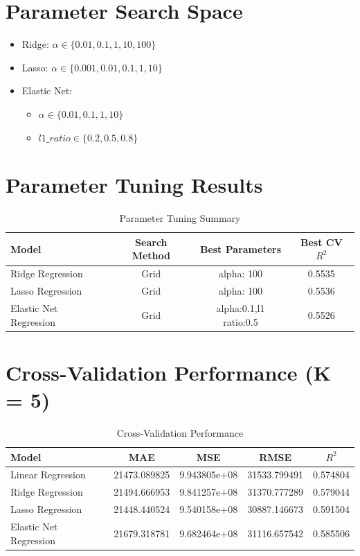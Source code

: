 \documentclass[11pt]{article}
\begin{document}
\section*{Parameter Search Space}
\begin{itemize}
    \item Ridge: $\alpha \in \{0.01, 0.1, 1, 10, 100\}$
    \item Lasso: $\alpha \in \{0.001, 0.01, 0.1, 1, 10\}$
    \item Elastic Net:
    \begin{itemize}
        \item $\alpha \in \{0.01, 0.1, 1, 10\}$
        \item $l1\_ratio \in \{0.2, 0.5, 0.8\}$
    \end{itemize}
\end{itemize}

\section*{Parameter Tuning Results}
\begin{table}[h!]
\centering
\renewcommand{\arraystretch}{1.3}
\caption{Parameter Tuning Summary}
\begin{tabular}{|l|c|c|c|}
\hline
Model & Search Method & Best Parameters & Best CV $R^2$ \\ \hline
Ridge Regression & Grid &alpha: 100  &0.5535 \\
Lasso Regression & Grid &alpha: 100  &0.5536  \\
Elastic Net Regression & Grid &alpha:0.1,l1 ratio:0.5  &  0.5526 \\ \hline
\end{tabular}
\end{table}

\section*{Cross-Validation Performance (K = 5)}
\begin{table}[h!]
\centering
\renewcommand{\arraystretch}{1.3}
\caption{Cross-Validation Performance}
\begin{tabular}{|l|c|c|c|c|}
\hline
Model & MAE & MSE & RMSE & $R^2$ \\ \hline
Linear Regression & 21473.089825 & 9.943805e+08 & 31533.799491 & 0.574804 \\ 
Ridge Regression & 21494.666953 & 9.841257e+08 & 31370.777289 & 0.579044 \\ 
Lasso Regression & 21448.440524 & 9.540158e+08 & 30887.146673 & 0.591504 \\ 
Elastic Net Regression & 21679.318781 & 9.682464e+08 & 31116.657542 & 0.585506 \\ \hline
\end{tabular}
\end{table}
\end{document}
